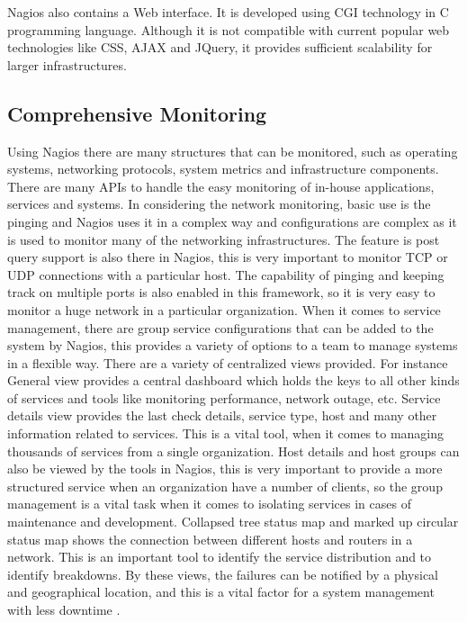 \documentclass[9pt,twocolumn,twoside]{../../styles/osajnl}
\begin{document}
Nagios also contains a Web interface. It is developed using
CGI technology in C programming language. Although it is not 
compatible with current popular web technologies like CSS, AJAX
and JQuery, it provides sufficient scalability for larger infrastructures.


\subsection{Comprehensive Monitoring}

Using Nagios there are many structures that can be monitored, such as
operating systems, networking protocols, system metrics and
infrastructure components. There are many APIs to handle the easy
monitoring of in-house applications, services and systems. In
considering the network monitoring, basic use is the pinging and
Nagios uses it in a complex way and configurations are complex as it
is used to monitor many of the networking infrastructures. The feature
is post query support is also there in Nagios, this is very important
to monitor TCP or UDP connections with a particular host. The
capability of pinging and keeping track on multiple ports is also
enabled in this framework, so it is very easy to monitor a huge
network in a particular organization. When it comes to service
management, there are group service configurations that can be added
to the system by Nagios, this provides a variety of options to a team
to manage systems in a flexible way. There are a variety of
centralized views provided. For instance General view provides a
central dashboard which holds the keys to all other kinds of services
and tools like monitoring performance, network outage, etc.  Service
details view provides the last check details, service type, host and
many other information related to services. This is a vital tool, when
it comes to managing thousands of services from a single
organization. Host details and host groups can also be viewed by the
tools in Nagios, this is very important to provide a more structured
service when an organization have a number of clients, so the group
management is a vital task when it comes to isolating services in
cases of maintenance and development. Collapsed tree status map and
marked up circular status map shows the connection between different
hosts and routers in a network. This is an important tool to identify
the service distribution and to identify breakdowns. By these views,
the failures can be notified by a physical and geographical location,
and this is a vital factor for a system management with less downtime
\cite{info-nagios}.
\end{document}
